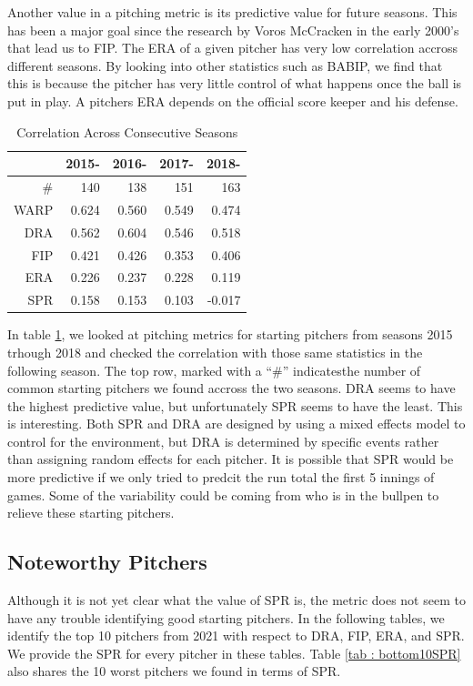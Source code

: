 \documentclass [52pt] {article}
\begin{document}
Another value in a pitching metric is its predictive value for future seasons.  This has been a major goal since the research by Voros McCracken in the early 2000's that lead us to FIP.  The ERA of a given pitcher has very low correlation accross different seasons.  By looking into other statistics such as BABIP, we find that this is because the pitcher has very little control of what happens once the ball is put in play.  A pitchers ERA depends on the official score keeper and his defense.  
\begin{table}[ht]
\centering
\begin{tabular}{rrrrr}
  \hline
 &2015- & 2016- & 2017- & 2018- \\ 
  \hline
\#& 140 & 138 & 151 & 163 \\ 
WARP & 0.624 & 0.560 & 0.549 & 0.474 \\ 
DRA  & 0.562 & 0.604 & 0.546 & 0.518 \\ 
FIP  & 0.421 & 0.426 & 0.353 & 0.406 \\ 
ERA & 0.226 & 0.237 & 0.228 & 0.119 \\ 
SPR & 0.158 & 0.153 & 0.103 & -0.017 \\ 
   \hline
\end{tabular}
\caption{Correlation Across Consecutive Seasons}
\label{tab : cross_ssn_corr}
\end{table}

In table \ref{tab : cross_ssn_corr}, we looked at pitching metrics for starting pitchers from seasons 2015 trhough 2018 and checked the correlation with those same statistics in the following season.  The top row, marked with a ``\#'' indicatesthe number of common starting pitchers we found accross the two seasons.  DRA seems to have the highest predictive value, but unfortunately SPR seems to have the least.  This is interesting.  Both SPR and DRA are designed by using a mixed effects model to control for the environment, but DRA is determined by specific events rather than assigning random effects for each pitcher.  It is possible that SPR would be more predictive if we only tried to predcit the run total the first 5 innings of games.  Some of the variability could be coming from who is in the bullpen to relieve these starting pitchers.


\subsection{Noteworthy Pitchers}

Although it is not yet clear what the value of SPR is, the metric does not seem to have any trouble identifying good starting pitchers.  In the following tables, we identify the top 10 pitchers from 2021 with respect to DRA, FIP, ERA, and SPR.  We provide the SPR for every pitcher in these tables.  Table \ref{tab : bottom10SPR} also shares the 10 worst pitchers we found in terms of SPR.
\end{document}
